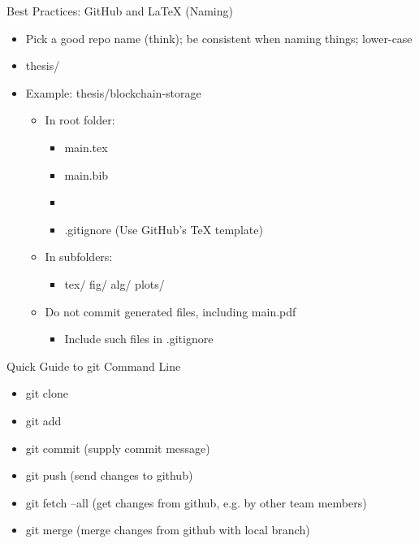 \documentclass[hyperref={pdfpagelabels=false}, aspectratio=1610,handout]{beamer}
\begin{document}
\begin{frame}
\begin{block}{Best Practices: GitHub and LaTeX (Naming)}
 \begin{itemize}
\item Pick a good repo name (think); be consistent when naming things; lower-case
\item thesis/
\item Example: thesis/blockchain-storage
  \begin{itemize}
  	\item In  root folder:
	\begin{itemize}
		\item main.tex
		\item main.bib
		\item {}
		\item .gitignore \quad (Use GitHub's TeX template)
	\end{itemize}
	\item In subfolders:
	\begin{itemize}
		\item tex/ \quad fig/ \quad alg/ \quad plots/
	\end{itemize}
	\item Do not commit generated files, including main.pdf
	\begin{itemize}
		\item Include such files in .gitignore
	\end{itemize}
  \end{itemize}
  \end{itemize}
\end{block}
\end{frame}

\begin{frame}
\begin{block}{Quick Guide to git Command Line}
 \begin{itemize}
  \item git clone 
  \item git add 
  \item git commit \quad (supply commit message)
  \item git push \quad (send changes to github)
  \item git fetch --all \quad (get changes from github, e.g. by other team members)
  \item git merge \quad (merge changes from github with local branch)
 \end{itemize}
\end{block}
\end{frame}
\end{document}
